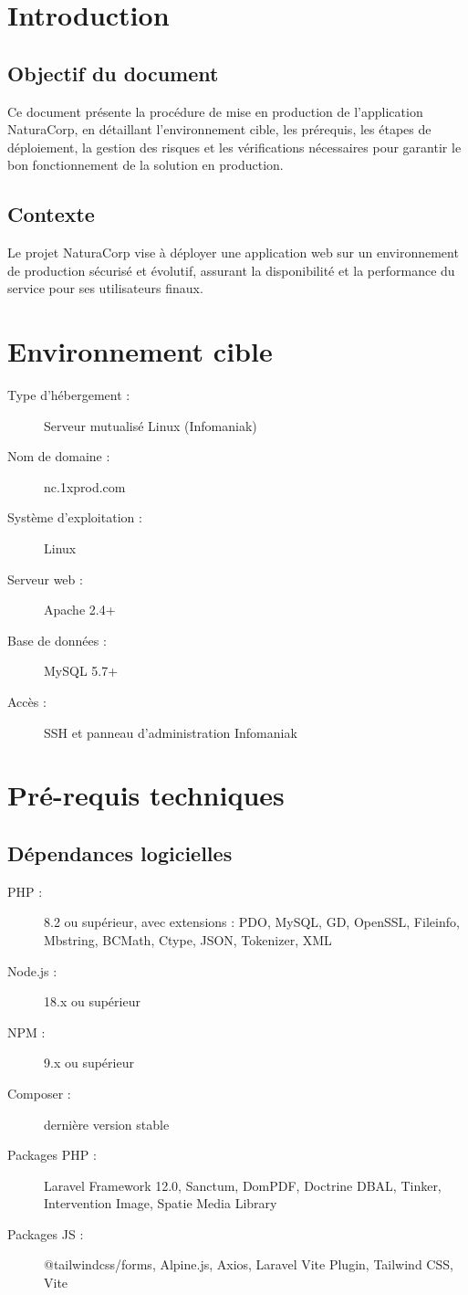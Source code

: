 \documentclass[a4paper,12pt]{report}
\begin{document}
\newpage
\tableofcontents
\newpage

\section{Introduction}
\subsection{Objectif du document}
Ce document présente la procédure de mise en production de l'application NaturaCorp, en détaillant l'environnement cible, les prérequis, les étapes de déploiement, la gestion des risques et les vérifications nécessaires pour garantir le bon fonctionnement de la solution en production.

\subsection{Contexte}
Le projet NaturaCorp vise à déployer une application web sur un environnement de production sécurisé et évolutif, assurant la disponibilité et la performance du service pour ses utilisateurs finaux.

\section{Environnement cible}
\begin{description}
  \item[Type d’hébergement :] Serveur mutualisé Linux (Infomaniak)
  \item[Nom de domaine :] nc.1xprod.com
  \item[Système d’exploitation :] Linux
  \item[Serveur web :] Apache 2.4+
  \item[Base de données :] MySQL 5.7+
  \item[Accès :] SSH et panneau d’administration Infomaniak
\end{description}

\section{Pré-requis techniques}
\subsection{Dépendances logicielles}
\begin{description}
  \item[PHP :] 8.2 ou supérieur, avec extensions : PDO, MySQL, GD, OpenSSL, Fileinfo, Mbstring, BCMath, Ctype, JSON, Tokenizer, XML
  \item[Node.js :] 18.x ou supérieur
  \item[NPM :] 9.x ou supérieur
  \item[Composer :] dernière version stable
  \item[Packages PHP :] Laravel Framework 12.0, Sanctum, DomPDF, Doctrine DBAL, Tinker, Intervention Image, Spatie Media Library
  \item[Packages JS :] @tailwindcss/forms, Alpine.js, Axios, Laravel Vite Plugin, Tailwind CSS, Vite
\end{description}
\end{document}
